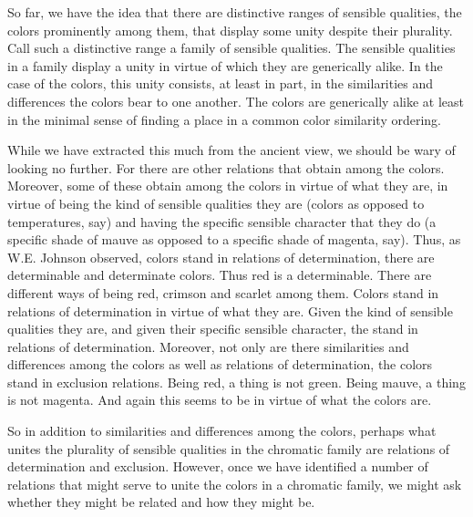 So far, we have the idea that there are distinctive ranges of sensible qualities, the colors prominently among them, that display some unity despite their plurality. Call such a distinctive range a family of sensible qualities. The sensible qualities in a family display a unity in virtue of which they are generically alike. In the case of the colors, this unity consists, at least in part, in the similarities and differences the colors bear to one another. The colors are generically alike at least in the minimal sense of finding a place in a common color similarity ordering. 

While we have extracted this much from the ancient view, we should be wary of looking no further. For there are other relations that obtain among the colors. Moreover, some of these obtain among the colors in virtue of what they are, in virtue of being the kind of sensible qualities they are (colors as opposed to temperatures, say) and having the specific sensible character that they do (a specific shade of mauve as opposed to a specific shade of magenta, say). Thus, as W.E. Johnson observed, colors stand in relations of determination, there are determinable and determinate colors. Thus red is a determinable. There are different ways of being red, crimson and scarlet among them. Colors stand in relations of determination in virtue of what they are. Given the kind of sensible qualities they are, and given their specific sensible character, the stand in relations of determination. Moreover, not only are there similarities and differences among the colors as well as relations of determination, the colors stand in exclusion relations. Being red, a thing is not green. Being mauve, a thing is not magenta. And again this seems to be in virtue of what the colors are. 

So in addition to similarities and differences among the colors, perhaps what unites the plurality of sensible qualities in the chromatic family are relations of determination and exclusion. However, once we have identified a number of relations that might serve to unite the colors in a chromatic family, we might ask whether they might be related and how they might be. 




